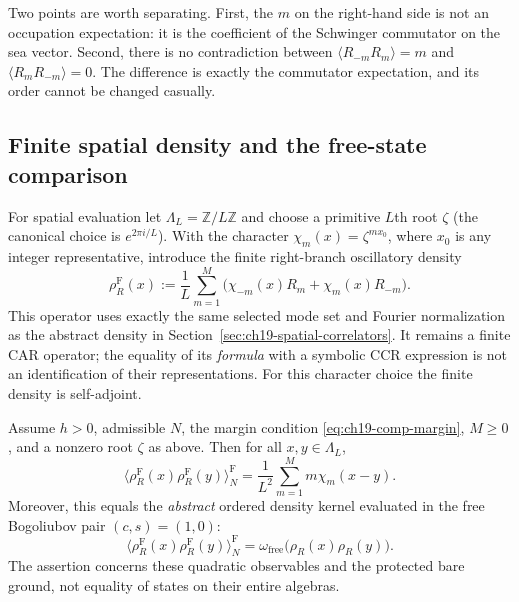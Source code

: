 Two points are worth separating.  First, the $m$ on the right-hand side
is not an occupation expectation: it is the coefficient of the Schwinger
commutator on the sea vector.  Second, there is no contradiction between
$\langle R_{-m}R_m\rangle=m$ and
$\langle R_mR_{-m}\rangle=0$.  The difference is exactly the
commutator expectation, and its order cannot be changed casually.

\subsection{Finite spatial density and the free-state comparison}

For spatial evaluation let $\Lambda_L=\mathbb Z/L\mathbb Z$ and choose a
primitive $L$th root $\zeta$ (the canonical choice is
$e^{2\pi i/L}$).  With the character
$\chi_m(x)=\zeta^{m x_0}$, where $x_0$ is any integer representative,
introduce the finite right-branch oscillatory density
\begin{equation}
 \rho_R^{\mathrm F}(x):=\frac1L\sum_{m=1}^{M}
 \bigl(\chi_{-m}(x)R_m+\chi_m(x)R_{-m}\bigr).
 \label{eq:ch19-comp-fock-density}
\end{equation}
This operator uses exactly the same selected mode set and Fourier
normalization as the abstract density in
Section~\ref{sec:ch19-spatial-correlators}.  It remains a finite CAR
operator; the equality of its \emph{formula} with a symbolic CCR
expression is not an identification of their representations.
For this character choice the finite density is self-adjoint.

\begin{theorem}
\label{thm:ch19-comp-free-kernel}
Assume $h>0$, admissible $N$, the margin condition
\eqref{eq:ch19-comp-margin}, $M\geq0$, and a nonzero root $\zeta$ as
above.  Then for all $x,y\in\Lambda_L$,
\begin{equation}
 \langle \rho_R^{\mathrm F}(x)\rho_R^{\mathrm F}(y)
 \rangle_N^{\mathrm F}
 =\frac{1}{L^2}\sum_{m=1}^{M}m\chi_m(x-y).
 \label{eq:ch19-comp-fock-kernel}
\end{equation}
Moreover, this equals the \emph{abstract} ordered density kernel
evaluated in the free Bogoliubov pair $(c,s)=(1,0)$:
\begin{equation}
 \langle \rho_R^{\mathrm F}(x)\rho_R^{\mathrm F}(y)
 \rangle_N^{\mathrm F}
 =\omega_{\mathrm{free}}\bigl(\rho_R(x)\rho_R(y)\bigr).
 \label{eq:ch19-comp-free-agreement}
\end{equation}
The assertion concerns these quadratic observables and the protected
bare ground, not equality of states on their entire algebras.
\end{theorem}

